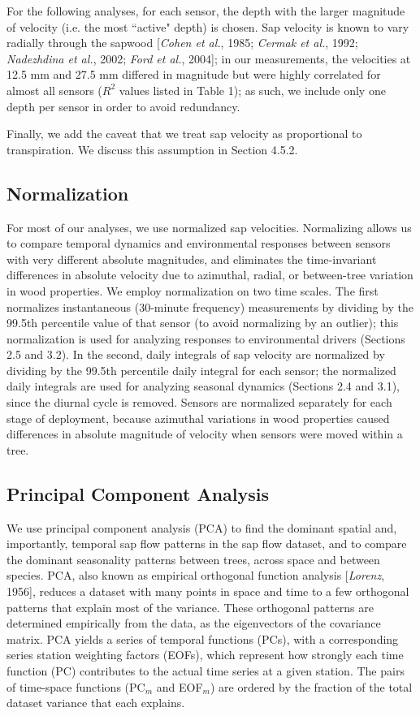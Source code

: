 For the following analyses, for each sensor, the depth with the larger magnitude of velocity (i.e. the most ``active" depth) is chosen.  Sap velocity is known to vary radially through the sapwood [\textit{Cohen et al.}, 1985; \textit{Cermak et al.}, 1992; \textit{Nadezhdina et al.}, 2002; \textit{Ford et al.}, 2004]; in our measurements, the velocities at 12.5 mm and 27.5 mm differed in magnitude but were highly correlated for almost all sensors ($R^2$ values listed in Table 1); as such, we include only one depth per sensor in order to avoid redundancy.

Finally, we add the caveat that we treat sap velocity as proportional to transpiration.  We discuss this assumption in Section 4.5.2.

\subsection{Normalization}
For most of our analyses, we use normalized sap velocities.  Normalizing allows us to compare temporal dynamics and environmental responses between sensors with very different absolute magnitudes, and eliminates the time-invariant differences in absolute velocity due to azimuthal, radial, or between-tree variation in wood properties.  We employ normalization on two time scales.   The first normalizes instantaneous (30-minute frequency) measurements by dividing by the 99.5th percentile value of that sensor (to avoid normalizing by an outlier); this normalization is used for analyzing responses to environmental drivers (Sections 2.5 and 3.2).  In the second, daily integrals of sap velocity are normalized by dividing by the 99.5th percentile daily integral for each sensor; the normalized daily integrals are used for analyzing seasonal dynamics (Sections 2.4 and 3.1), since the diurnal cycle is removed.  Sensors are normalized separately for each stage of deployment, because azimuthal variations in wood properties caused differences in absolute magnitude of velocity when sensors were moved within a tree.

\subsection{Principal Component Analysis}
We use principal component analysis (PCA) to find the dominant spatial and, importantly, temporal sap flow patterns in the sap flow dataset, and to compare the dominant seasonality patterns between trees, across space and between species.  PCA, also known as empirical orthogonal function analysis [\textit{Lorenz}, 1956], reduces a dataset with many points in space and time to a few orthogonal patterns that explain most of the variance. These orthogonal patterns are determined empirically from the data, as the eigenvectors of the covariance matrix.  PCA yields a series of temporal functions (PCs), with a corresponding series station weighting factors (EOFs), which represent how strongly each time function (PC) contributes to the actual time series at a given station.  The pairs of time-space functions (PC$_m$ and EOF$_m$) are ordered by the fraction of the total dataset variance that each explains.

